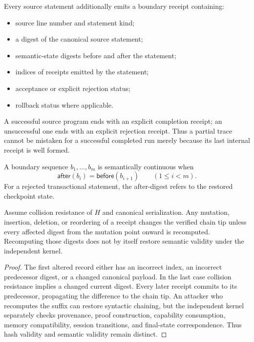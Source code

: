 Every source statement additionally emits a boundary receipt containing:
\begin{itemize}[leftmargin=1.6em]
  \item source line number and statement kind;
  \item a digest of the canonical source statement;
  \item semantic-state digests before and after the statement;
  \item indices of receipts emitted by the statement;
  \item acceptance or explicit rejection status;
  \item rollback status where applicable.
\end{itemize}
A successful source program ends with an explicit completion receipt; an unsuccessful one ends with an explicit rejection receipt.  Thus a partial trace cannot be mistaken for a successful completed run merely because its last internal receipt is well formed.

\begin{definition}
A boundary sequence \(b_1,\ldots,b_m\) is semantically continuous when
\[
\mathsf{after}(b_i)=\mathsf{before}(b_{i+1})
\qquad(1\le i<m).
\]
For a rejected transactional statement, the after-digest refers to the restored checkpoint state.
\end{definition}

\begin{proposition}
\label{prop:hash-chain}
Assume collision resistance of \(H\) and canonical serialization.  Any mutation, insertion, deletion, or reordering of a receipt changes the verified chain tip unless every affected digest from the mutation point onward is recomputed.  Recomputing those digests does not by itself restore semantic validity under the independent kernel.
\end{proposition}

\begin{proof}
The first altered record either has an incorrect index, an incorrect predecessor digest, or a changed canonical payload.  In the last case collision resistance implies a changed current digest.  Every later receipt commits to its predecessor, propagating the difference to the chain tip.  An attacker who recomputes the suffix can restore syntactic chaining, but the independent kernel separately checks provenance, proof construction, capability consumption, memory compatibility, session transitions, and final-state correspondence.  Thus hash validity and semantic validity remain distinct.  \qedhere
\end{proof}

